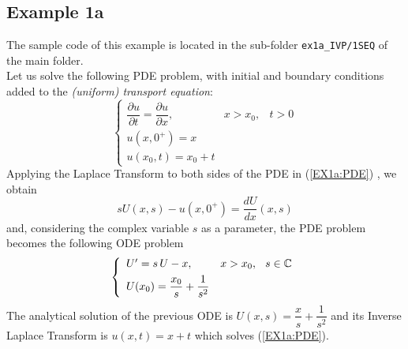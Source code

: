 \documentclass[a4paper,10pt]{report}%
\begin{document}
\subsection{Example 1a} \label{SEQ:1a}
The sample code of this example is located in the sub-folder {\tt ex1a\_IVP/1SEQ} of the main folder.
\\
Let us solve the following PDE problem, with initial and boundary conditions added to the {\em (uniform)
transport equation}:
\begin{equation}\label{EX1a:PDE}
\left\{\begin{array}{lll}
\dfrac{\partial u}{\partial t} = \dfrac{\partial u}{\partial x}, & x>x_0, & t>0 \\[8pt]
u(x,0^+) = x \\[4pt]
u(x_0,t) = x_0 + t
\end{array}\right.
\end{equation}
Applying the Laplace Transform to both sides of the PDE in (\ref{EX1a:PDE}) \cite{SCHIFF:1999}, we obtain
\[
sU(x,s) - u(x,0^+) = \frac{d U}{d x}(x,s)
\]
and, considering the complex variable $s$ as a parameter, the PDE problem becomes the following ODE problem
\begin{equation}\label{EX1a:ODE}
\left\{\begin{array}{ll}
U' = s\,U - x, & x>x_0, \hspace*{.25cm} s\in{\mathbb C} \\[4pt]
U(x_0) = \dfrac{x_0}{s} + \dfrac{1}{s^2}
\end{array}\right.
\end{equation}
The analytical solution of the previous ODE is $U(x,s) = \dfrac{x}{s} + \dfrac{1}{s^2}$ and its Inverse Laplace Transform is $u(x,t) = x+t$ which solves (\ref{EX1a:PDE}).
\end{document}
